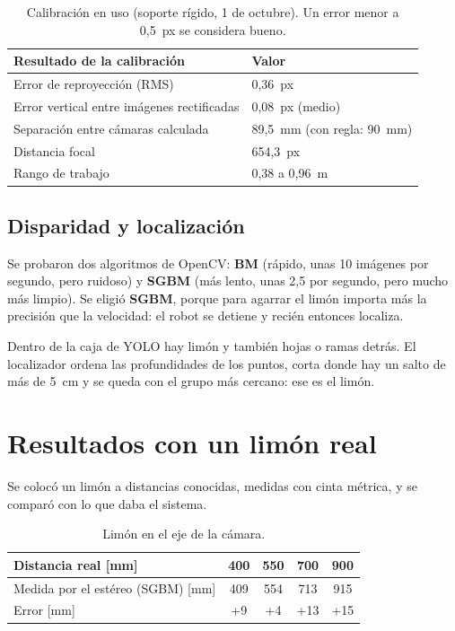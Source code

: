 \documentclass[11pt,a4paper]{article}
\begin{document}
\begin{table}[H]
\centering
\begin{tabular}{@{}ll@{}}
\toprule
\textbf{Resultado de la calibración} & \textbf{Valor} \\
\midrule
Error de reproyección (RMS) & 0,36~px \\
Error vertical entre imágenes rectificadas & 0,08~px (medio) \\
Separación entre cámaras calculada & 89,5~mm (con regla: 90~mm) \\
Distancia focal & 654,3~px \\
Rango de trabajo & 0,38 a 0,96~m \\
\bottomrule
\end{tabular}
\caption{Calibración en uso (soporte rígido, 1 de octubre). Un error menor a 0,5~px se considera bueno.}
\end{table}

\subsection{Disparidad y localización}
Se probaron dos algoritmos de OpenCV: \textbf{BM} (rápido, unas 10 imágenes por segundo, pero ruidoso) y
\textbf{SGBM} (más lento, unas 2,5 por segundo, pero mucho más limpio). Se eligió \textbf{SGBM}, porque para
agarrar el limón importa más la precisión que la velocidad: el robot se detiene y recién entonces localiza.

Dentro de la caja de YOLO hay limón y también hojas o ramas detrás. El localizador ordena las profundidades de los
puntos, corta donde hay un salto de más de 5~cm y se queda con el grupo más cercano: ese es el limón.

\section{Resultados con un limón real}

Se colocó un limón a distancias conocidas, medidas con cinta métrica, y se comparó con lo que daba el sistema.

\begin{table}[H]
\centering
\begin{tabular}{@{}lcccc@{}}
\toprule
\textbf{Distancia real [mm]} & 400 & 550 & 700 & 900 \\
\midrule
Medida por el estéreo (SGBM) [mm] & 409 & 554 & 713 & 915 \\
Error [mm] & +9 & +4 & +13 & +15 \\
\bottomrule
\end{tabular}
\caption{Limón en el eje de la cámara.}
\end{table}
\end{document}
